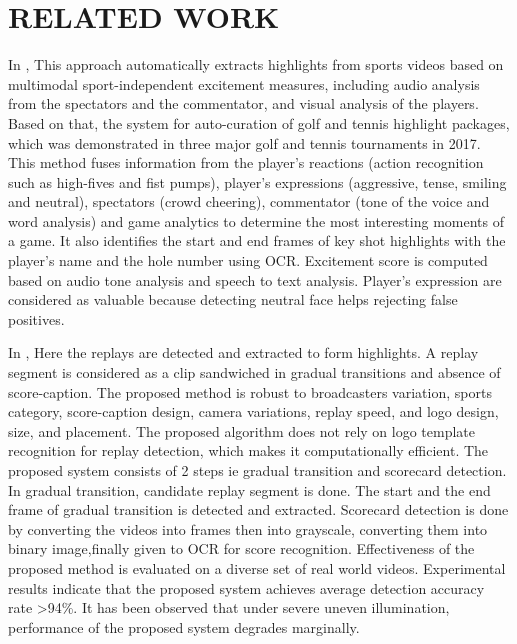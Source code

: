 
\chapter{RELATED WORK} %
In \cite{8491305}, This approach automatically extracts highlights from sports videos based on multimodal sport-independent excitement measures, including audio analysis from the spectators and the commentator, and visual analysis of the players. Based on that, the system for auto-curation of golf and tennis highlight packages, which was demonstrated in three major golf and tennis tournaments in 2017. This method fuses information from the player’s reactions (action recognition such as high-fives and fist pumps), player’s expressions (aggressive, tense, smiling and neutral), spectators (crowd cheering), commentator (tone of the voice and word analysis) and game analytics to determine the most interesting moments of a game. It also identifies the start and end frames of key shot highlights with the player’s name and the hole number using OCR. Excitement score is computed based on audio tone analysis and speech to text analysis. Player’s expression are considered as valuable because detecting neutral face helps rejecting false positives.

In \cite{7479531}, Here the replays are detected and extracted to form highlights. A replay segment is considered as a clip sandwiched in gradual transitions and absence of score-caption. The proposed method is robust to broadcasters variation, sports category, score-caption design, camera variations, replay speed, and logo design, size, and placement. The proposed algorithm does not rely on logo template recognition for replay detection, which makes it computationally efficient. The proposed system consists of 2 steps ie gradual transition and scorecard detection. In gradual transition, candidate replay segment is done. The start and the end frame of gradual transition is detected and extracted. Scorecard detection is done by converting the videos into frames then into grayscale, converting them into binary image,finally given to OCR for score recognition. Effectiveness of the proposed method is evaluated on a diverse set of real world videos. Experimental results indicate that the proposed system achieves average detection accuracy rate \textgreater 94\%. It has been observed that under severe uneven illumination, performance of the proposed system degrades marginally.

